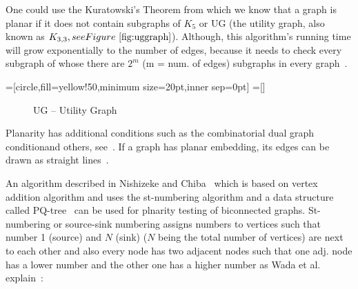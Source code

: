 One could use the Kuratowski's Theorem from which we know that a graph is planar if it does not contain subgraphs
of $ K_5 $ or UG (the utility graph, also known as $ K_{3,3}, see Figure~\ref{fig:uggraph} $). Although, this algorithm's running time will
grow exponentially to the number of edges, because it needs to check every subgraph of whose there are $ 2^m $ 
(m = num. of edges) subgraphs in every graph~\autocite[23]{nishizeki2008planar}.

=[circle,fill=yellow!50,minimum size=20pt,inner sep=0pt]
=[]

\begin{figure}[h]
\caption{UG -- Utility Graph}
\label{fig:uggraph}
\end{figure}

Planarity has additional conditions such as the combinatorial dual graph conditionand others, 
see~\autocite{weisstein2009planar,weisstein1999dual}. If a graph has planar embedding, its edges can be drawn 
as straight lines~\autocite{fary1948,deo1974graphs,weisstein2009planar}.

An algorithm described in Nishizeke and Chiba~\autocite{nishizeki2008planar} which is based on vertex addition 
algorithm and uses the st-numbering algorithm and a data structure 
called PQ-tree~\autocite[33]{nishizeki2008planar} can be used for plnarity testing of biconnected graphs. 
St-numbering or source-sink numbering assigns numbers to vertices such that number 1 (source) and $ N $ (sink) 
($ N $ being the total number of vertices) are next to each other and also every node has two adjacent nodes 
such that one adj. node has a lower number and the other one has a higher number 
as Wada et al. explain~\autocite[357]{wada1997Biconnected}:


